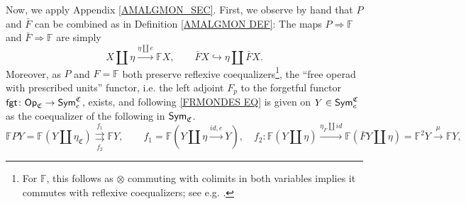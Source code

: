 \documentclass[a4paper,10pt
,draft
]{article}%
\renewcommand{\1}{\eta}%
\begin{document}
Now, we apply Appendix \ref{AMALGMON_SEC}.
First, we observe by hand %
that $P$ and $\bar F$ can be combined as in Definition \ref{AMALGMON DEF}:
The maps $P \Rightarrow \mathbb F$ and $\bar F \Rightarrow \mathbb F$ are simply
\[
      X \amalg \eta \xrightarrow{\eta \amalg e} \mathbb F X,
      \qquad
      \bar F X \hookrightarrow \eta \amalg \bar F X.
\]
Moreover, as $P$ and $F = \mathbb F$ both preserve reflexive coequalizers\footnote{
  For $\mathbb F$, this follows as $\otimes$ commuting with colimits in both variables implies it commutes with reflexive coequalizers; see e.g. \cite[Lemma 2.3.2]{Rez96}.},
the ``free operad with prescribed units'' functor, i.e. the left adjoint $F_p$ to the forgetful functor $\mathsf{fgt} \colon \mathsf{Op}_{\mathfrak C} \to \mathsf{Sym}^{\mathfrak C}_e$, exists,
and following \eqref{FRMONDES EQ} is given on $Y \in \mathsf{Sym}^{\mathfrak C}_e$ as the coequalizer of the following in $\mathsf{Sym}_{\mathfrak C}$.
\begin{equation}
      \label{FPYCOEQ_EQ}
      \mathbb F P Y = \mathbb F(Y \amalg \eta_{\mathfrak C}) \overset{f_1}{\underset{f_2}\rightrightarrows} \mathbb F Y,
      \qquad
      f_1 = \mathbb F(Y \amalg \eta \xrightarrow{id,e} Y),
      \quad
      f_2 \colon \mathbb F(Y \amalg \eta) \xrightarrow{\eta_{\bar F} \amalg id} \mathbb F(\bar F Y \amalg \eta) = \mathbb F^2 Y \xrightarrow{\mu} \mathbb FY,
\end{equation}
\end{document}
